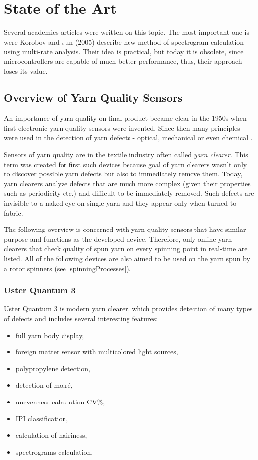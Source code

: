 \documentclass[twoside]{ctuthesis}
\theoremstyle{plain}
\theoremstyle{definition}
\theoremstyle{note}
\begin{document}
\section{State of the Art}

Several academics articles were written on this topic. The most important one is \cite{cite:paperKorobov_Jun} were Korobov and Jun (2005) describe new method of spectrogram calculation using multi-rate analysis. Their idea is practical, but today it is obsolete, since microcontrollers are capable of much better performance, thus, their approach loses its value. 

\subsection{Overview of Yarn Quality Sensors}
An importance of yarn quality on final product became clear in the 1950s when first electronic yarn quality sensors were invented. Since then many principles were used in the detection of yarn defects - optical, mechanical or even chemical \cite{cite:1}.

Sensors of yarn quality are in the textile industry often called \textit{yarn clearer}. This term was created for first such devices because goal of yarn clearers wasn't only to discover possible yarn defects but also to immediately remove them. Today, yarn clearers analyze defects that are much more complex (given their properties such as periodicity etc.) and difficult to be immediately removed. Such defects are invisible to a naked eye on single yarn and they appear only when turned to fabric.

The following overview is concerned with yarn quality sensors that have similar purpose and functions as the developed device. Therefore, only online yarn clearers that check quality of spun yarn on every spinning point in real-time are listed. All of the following devices are also aimed to be used on the yarn spun by a rotor spinners (see \ref{spinningProcesses}).

\subsubsection{Uster Quantum 3}
Uster Quantum 3 is modern yarn clearer, which provides detection of many types of defects and includes several interesting features:

\begin{itemize}
	\setlength{\itemsep}{5pt}
	\item full yarn body display,
	\item foreign matter sensor with multicolored light sources,
	\item polypropylene detection,
	\item detection of moiré,
	\item unevenness calculation CV\%,
	\item IPI classification,
	\item calculation of hairiness,
	\item spectrograms calculation.
\end{itemize}
\end{document}
